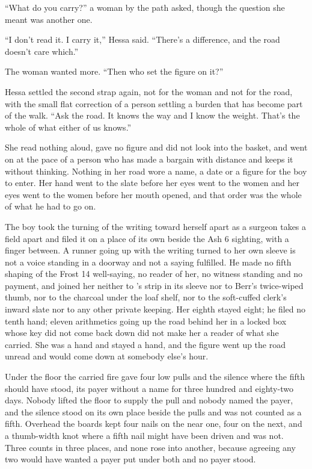 “What do you carry?” a woman by the path asked, though the question she meant was another one.

“I don't read it. I carry it,” Hessa said. “There's a difference, and the road doesn't care which.”

The woman wanted more. “Then who set the figure on it?”

Hessa settled the second strap again, not for the woman and not for the road, with the small flat correction of a person settling a burden that has become part of the walk. “Ask the road. It knows the way and I know the weight. That's the whole of what either of us knows.”

She read nothing aloud, gave no figure and did not look into the basket, and went on at the pace of a person who has made a bargain with distance and keeps it without thinking. Nothing in her road wore a name, a date or a figure for the boy to enter. Her hand went to the slate before her eyes went to the women and her eyes went to the women before her mouth opened, and that order was the whole of what he had to go on.

The boy took the turning of the writing toward herself apart as a surgeon takes a field apart and filed it on a place of its own beside the Ash 6 sighting, with a finger between. A runner going up with the writing turned to her own sleeve is not a voice standing in a doorway and not a saying fulfilled. He made no fifth shaping of the Frost 14 well-saying, no reader of her, no witness standing and no payment, and joined her neither to 's strip in its sleeve nor to Berr's twice-wiped thumb, nor to the charcoal under the loaf shelf, nor to the soft-cuffed clerk's inward slate nor to any other private keeping. Her eighth stayed eight; he filed no tenth hand; eleven arithmetics going up the road behind her in a locked box whose key did not come back down did not make her a reader of what she carried. She was a hand and stayed a hand, and the figure went up the road unread and would come down at somebody else's hour.

\scenebreak

Under the floor the carried fire gave four low pulls and the silence where the fifth should have stood, its payer without a name for three hundred and eighty-two days. Nobody lifted the floor to supply the pull and nobody named the payer, and the silence stood on its own place beside the pulls and was not counted as a fifth. Overhead the boards kept four nails on the near one, four on the next, and a thumb-width knot where a fifth nail might have been driven and was not. Three counts in three places, and none rose into another, because agreeing any two would have wanted a payer put under both and no payer stood.


